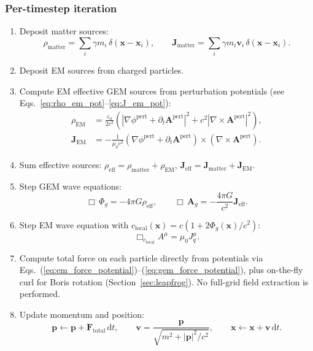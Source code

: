 \documentclass[11pt,a4paper]{article}
\newcommand{\vv}[1]{\mathbf{#1}}
\newcommand{\Phig}{\Phi_g}
\newcommand{\Ag}{\vv{A}_g}
\newcommand{\dd}{\mathrm{d}}
\begin{document}
\subsubsection*{Per-timestep iteration}
\begin{enumerate}
  \item Deposit matter sources:
  \begin{equation}
    \rho_{\mathrm{matter}} = \sum_i \gamma m_i\,\delta(\vv{x}-\vv{x}_i), \qquad
    \vv{J}_{\mathrm{matter}} = \sum_i \gamma m_i\vv{v}_i\,\delta(\vv{x}-\vv{x}_i).
  \end{equation}

  \item Deposit EM sources from charged particles.

  \item Compute EM effective GEM sources from perturbation potentials (see Eqs.~\ref{eq:rho_em_pot}--\ref{eq:J_em_pot}):
  \begin{align}
    \rho_{\mathrm{EM}} &= \frac{\varepsilon_0}{2c^2}\!\left(|\nabla\phi^{\mathrm{pert}} + \partial_t\vv{A}^{\mathrm{pert}}|^2
      + c^2|\nabla\times\vv{A}^{\mathrm{pert}}|^2\right), \\
    \vv{J}_{\mathrm{EM}} &= -\frac{1}{\mu_0 c^2}\!\left(\nabla\phi^{\mathrm{pert}} + \partial_t\vv{A}^{\mathrm{pert}}\right)
      \times\!\left(\nabla\times\vv{A}^{\mathrm{pert}}\right).
  \end{align}

  \item Sum effective sources: $\rho_{\mathrm{eff}} = \rho_{\mathrm{matter}} + \rho_{\mathrm{EM}}$,\; $\vv{J}_{\mathrm{eff}} = \vv{J}_{\mathrm{matter}} + \vv{J}_{\mathrm{EM}}$.

  \item Step GEM wave equations:
  \begin{equation}
    \Box\,\Phig = -4\pi G\rho_{\mathrm{eff}}, \qquad
    \Box\,\Ag   = -\frac{4\pi G}{c^2}\vv{J}_{\mathrm{eff}}.
  \end{equation}

  \item Step EM wave equation with $c_{\mathrm{local}}(\vv{x}) = c\!\left(1 + 2\Phig(\vv{x})/c^2\right)$:
  \begin{equation}
    \Box_{c_{\mathrm{local}}} A^\mu = \mu_0 J^\mu_q.
  \end{equation}

  \item Compute total force on each particle directly from potentials via Eqs.~(\ref{eq:em_force_potential})--(\ref{eq:gem_force_potential}), plus on-the-fly curl for Boris rotation (Section~\ref{sec:leapfrog}).  No full-grid field extraction is performed.

  \item Update momentum and position:
  \begin{equation}
    \vv{p} \leftarrow \vv{p} + \vv{F}_{\mathrm{total}}\,\dd t, \qquad
    \vv{v} = \frac{\vv{p}}{\sqrt{m^2+|\vv{p}|^2/c^2}}, \qquad
    \vv{x} \leftarrow \vv{x} + \vv{v}\,\dd t.
  \end{equation}
\end{enumerate}
\end{document}
